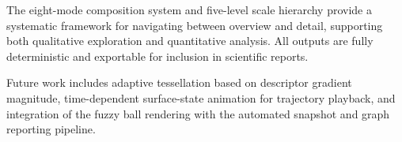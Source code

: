 \documentclass[12pt, a4paper, oneside]{article}
\begin{document}
The eight-mode composition system and five-level scale hierarchy
provide a systematic framework for navigating between overview and
detail, supporting both qualitative exploration and quantitative
analysis.  All outputs are fully deterministic and exportable for
inclusion in scientific reports.

Future work includes adaptive tessellation based on descriptor
gradient magnitude, time-dependent surface-state animation for
trajectory playback, and integration of the fuzzy ball rendering
with the automated snapshot and graph reporting pipeline.


\end{document}
